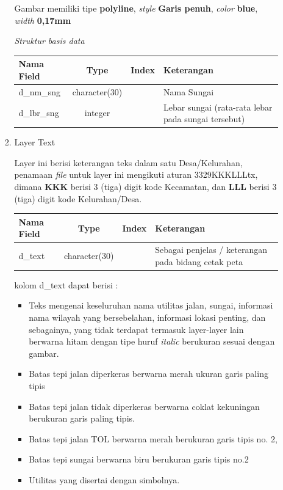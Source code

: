 \begin{enumerate}[\bfseries A.]
\begin{enumerate}[1.]
\begin{enumerate}[1.]
        Gambar memiliki tipe \textbf{polyline}, \textit{style} \textbf{Garis penuh}, \textit{color} \textbf{blue}, \textit{width} \textbf{0,17mm}
        
        \textit{Struktur basis data}
      
        \begin{tabular}{| l | c | c | p{5cm} |}
          \hline
          Nama Field & Type & Index & Keterangan \\
          \hline
          d\_nm\_sng & character(30) &  & Nama Sungai \\
          \hline
          d\_lbr\_sng & integer & & Lebar sungai (rata-rata lebar pada sungai tersebut) \\
          \hline
        \end{tabular}
      
      \item Layer Text
      
        Layer ini berisi keterangan teks dalam satu Desa/Kelurahan, penamaan \textit{file} untuk layer ini mengikuti aturan 3329KKKLLLtx, dimana \textbf{KKK} berisi 3 (tiga) digit kode Kecamatan, dan \textbf{LLL} berisi 3 (tiga) digit kode Kelurahan/Desa.
      
        \begin{tabular}{| l | c | c | p{5cm} |}
          \hline
          Nama Field & Type & Index & Keterangan \\
          \hline
          d\_text & character(30) & & Sebagai penjelas / keterangan pada bidang cetak peta \\
          \hline
        \end{tabular}
        
        kolom d\_text dapat berisi :
        
        \begin{itemize}
          \item Teks mengenai keseluruhan nama utilitas jalan, sungai, informasi nama wilayah yang bersebelahan, informasi lokasi penting, dan sebagainya, yang tidak terdapat termasuk layer-layer lain berwarna hitam dengan tipe huruf \textit{italic} berukuran sesuai dengan gambar.
          \item Batas tepi jalan diperkeras berwarna merah ukuran garis paling tipis
          \item Batas tepi jalan tidak diperkeras berwarna coklat kekuningan berukuran garis paling tipis.
          \item Batas tepi jalan TOL berwarna merah berukuran garis tipis no. 2,
          \item Batas tepi sungai berwarna biru berukuran garis tipis no.2
          \item Utilitas yang disertai dengan simbolnya.
        \end{itemize}
      

\end{enumerate}
\end{enumerate}
\end{enumerate}
